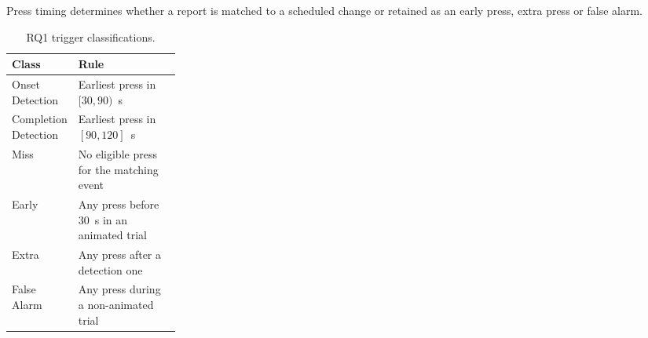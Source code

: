 \documentclass[
english,                 %
bibtex,                  %
includeExtraAbstracts, %
]{kththesis}
\newenvironment{evidenceblock}{\par\addvspace{6pt}\noindent\begin{minipage}{\linewidth}}{\end{minipage}\par\addvspace{6pt}}
\numberwithin{listing}{chapter}
\begin{document}
\begin{evidenceblock}
\normalsize
Press timing determines whether a report is matched to a scheduled change or retained as an early press, extra press or false alarm.

\begin{table}[H]
  \centering
  \scriptsize
  \setlength{\tabcolsep}{4pt}
  \caption[trigger classifications]{RQ1 trigger classifications.}
  \label{tab:rq1-trigger-classifications}
  \renewcommand{\arraystretch}{1.05}
  \begin{tabularx}{\linewidth}{@{}>{\raggedright\arraybackslash}p{0.25\linewidth} >{\raggedright\arraybackslash}X@{}}
    \toprule
    Class & Rule\\ \midrule
    Onset Detection & Earliest press in \([30,90)\)~s\\
    Completion Detection & Earliest press in \([90,120]\)~s\\
    Miss & No eligible press for the matching event\\
    Early & Any press before 30~s in an animated trial\\
    Extra & Any press after a detection one\\
    False Alarm & Any press during a non-animated trial\\

\bottomrule
\end{tabularx}
\end{table}
\end{evidenceblock}
\end{document}
